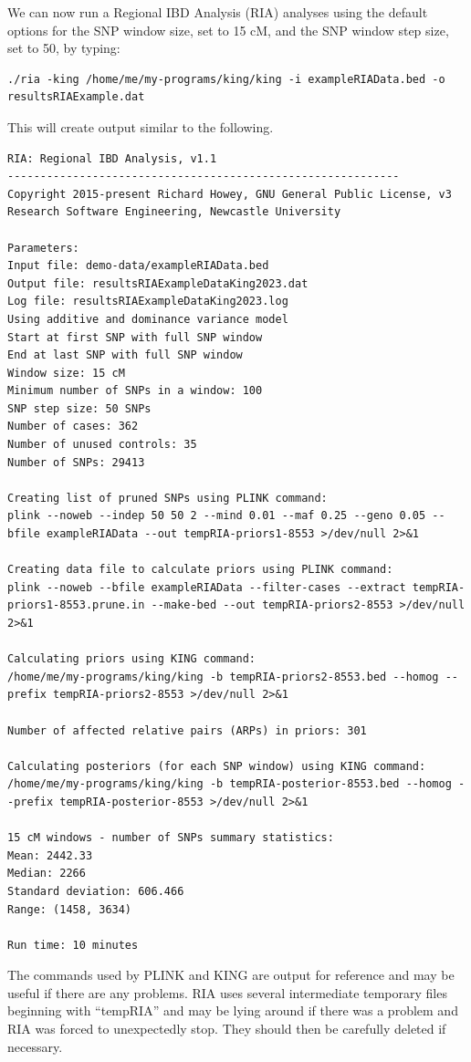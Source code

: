 \documentclass[a4paper,12pt]{article}
\begin{document}
We can now run a Regional IBD Analysis (RIA) analyses using the default options for the SNP window size, set to 15 cM, and the SNP window step size, set to 50, by typing: 
\vspace{0.35cm} \begin{lstlisting}
./ria -king /home/me/my-programs/king/king -i exampleRIAData.bed -o resultsRIAExample.dat

\end{lstlisting} \vspace{0.35cm}
This will create output similar to the following. 
\vspace{0.35cm} \begin{lstlisting}
RIA: Regional IBD Analysis, v1.1
------------------------------------------------------------
Copyright 2015-present Richard Howey, GNU General Public License, v3
Research Software Engineering, Newcastle University

Parameters:
Input file: demo-data/exampleRIAData.bed
Output file: resultsRIAExampleDataKing2023.dat
Log file: resultsRIAExampleDataKing2023.log
Using additive and dominance variance model
Start at first SNP with full SNP window
End at last SNP with full SNP window
Window size: 15 cM
Minimum number of SNPs in a window: 100
SNP step size: 50 SNPs
Number of cases: 362
Number of unused controls: 35
Number of SNPs: 29413

Creating list of pruned SNPs using PLINK command:
plink --noweb --indep 50 50 2 --mind 0.01 --maf 0.25 --geno 0.05 --bfile exampleRIAData --out tempRIA-priors1-8553 >/dev/null 2>&1

Creating data file to calculate priors using PLINK command:
plink --noweb --bfile exampleRIAData --filter-cases --extract tempRIA-priors1-8553.prune.in --make-bed --out tempRIA-priors2-8553 >/dev/null 2>&1

Calculating priors using KING command:
/home/me/my-programs/king/king -b tempRIA-priors2-8553.bed --homog --prefix tempRIA-priors2-8553 >/dev/null 2>&1

Number of affected relative pairs (ARPs) in priors: 301

Calculating posteriors (for each SNP window) using KING command:
/home/me/my-programs/king/king -b tempRIA-posterior-8553.bed --homog --prefix tempRIA-posterior-8553 >/dev/null 2>&1

15 cM windows - number of SNPs summary statistics:
Mean: 2442.33
Median: 2266
Standard deviation: 606.466
Range: (1458, 3634)

Run time: 10 minutes

\end{lstlisting} \vspace{0.35cm}
The commands used by PLINK and KING are output for reference and may be useful if there are any problems. RIA uses several intermediate temporary files beginning with ``tempRIA'' and may be lying around if there was a problem and RIA was forced to unexpectedly stop. They should then be carefully deleted if necessary. 
\end{document}
